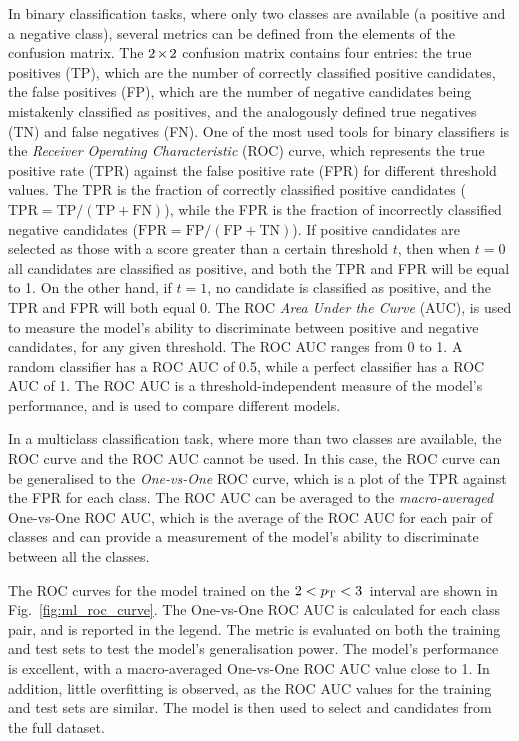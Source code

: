 In binary classification tasks, where only two classes are available (a positive and a negative class), several metrics can be defined from the elements of the confusion matrix. The $2\mkern-2mu\times\mkern-2mu2$ confusion matrix contains four entries: the true positives (TP), which are the number of correctly classified positive candidates, the false positives (FP), which are the number of negative candidates being mistakenly classified as positives, and the analogously defined true negatives (TN) and false negatives (FN). One of the most used tools for binary classifiers is the \emph{Receiver Operating Characteristic} (ROC) curve, which represents the true positive rate (TPR) against the false positive rate (FPR) for different threshold values. The TPR is the fraction of correctly classified positive candidates ($\mathrm{TPR = TP/(TP+FN)}$), while the FPR is the fraction of incorrectly classified negative candidates ($\mathrm{FPR = FP/(FP+TN)}$). If positive candidates are selected as those with a score greater than a certain threshold $t$, then when $t=0$ all candidates are classified as positive, and both the TPR and FPR will be equal to 1. On the other hand, if $t=1$, no candidate is classified as positive, and the TPR and FPR will both equal 0. The ROC \emph{Area Under the Curve} (AUC), is used to measure the model's ability to discriminate between positive and negative candidates, for any given threshold. The ROC AUC ranges from 0 to 1. A random classifier has a ROC AUC of 0.5, while a perfect classifier has a ROC AUC of 1. The ROC AUC is a threshold-independent measure of the model's performance, and is used to compare different models. 

In a multiclass classification task, where more than two classes are available, the ROC curve and the ROC AUC cannot be used. In this case, the ROC curve can be generalised to the \emph{One-vs-One} ROC curve, which is a plot of the TPR against the FPR for each class. The ROC AUC can be averaged to the \emph{macro-averaged} One-vs-One ROC AUC, which is the average of the ROC AUC for each pair of classes and can provide a measurement of the model's ability to discriminate between all the classes.


The ROC curves for the model trained on the $2<p_\mathrm{T}<3$~\gevc interval are shown in Fig.~\ref{fig:ml_roc_curve}. The One-vs-One ROC AUC is calculated for each class pair, and is reported in the legend. The metric is evaluated on both the training and test sets to test the model's generalisation power. The model's performance is excellent, with a macro-averaged One-vs-One ROC AUC value close to 1. In addition, little overfitting is observed, as the ROC AUC values for the training and test sets are similar. The model is then used to select \ds and \dpl candidates from the full dataset. 

